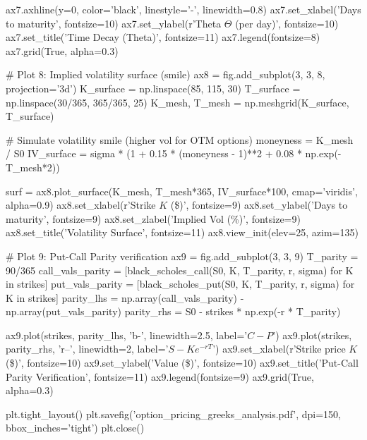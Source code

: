 \documentclass[a4paper, 11pt]{article}
\begin{document}
\begin{pycode}
ax7.axhline(y=0, color='black', linestyle='-', linewidth=0.8)
ax7.set_xlabel('Days to maturity', fontsize=10)
ax7.set_ylabel(r'Theta $\Theta$ (per day)', fontsize=10)
ax7.set_title('Time Decay (Theta)', fontsize=11)
ax7.legend(fontsize=8)
ax7.grid(True, alpha=0.3)

# Plot 8: Implied volatility surface (smile)
ax8 = fig.add_subplot(3, 3, 8, projection='3d')
K_surface = np.linspace(85, 115, 30)
T_surface = np.linspace(30/365, 365/365, 25)
K_mesh, T_mesh = np.meshgrid(K_surface, T_surface)

# Simulate volatility smile (higher vol for OTM options)
moneyness = K_mesh / S0
IV_surface = sigma * (1 + 0.15 * (moneyness - 1)**2 + 0.08 * np.exp(-T_mesh*2))

surf = ax8.plot_surface(K_mesh, T_mesh*365, IV_surface*100, cmap='viridis', alpha=0.9)
ax8.set_xlabel(r'Strike $K$ (\$)', fontsize=9)
ax8.set_ylabel('Days to maturity', fontsize=9)
ax8.set_zlabel('Implied Vol (\%)', fontsize=9)
ax8.set_title('Volatility Surface', fontsize=11)
ax8.view_init(elev=25, azim=135)

# Plot 9: Put-Call Parity verification
ax9 = fig.add_subplot(3, 3, 9)
T_parity = 90/365
call_vals_parity = [black_scholes_call(S0, K, T_parity, r, sigma) for K in strikes]
put_vals_parity = [black_scholes_put(S0, K, T_parity, r, sigma) for K in strikes]
parity_lhs = np.array(call_vals_parity) - np.array(put_vals_parity)
parity_rhs = S0 - strikes * np.exp(-r * T_parity)

ax9.plot(strikes, parity_lhs, 'b-', linewidth=2.5, label='$C - P$')
ax9.plot(strikes, parity_rhs, 'r--', linewidth=2, label='$S - Ke^{-rT}$')
ax9.set_xlabel(r'Strike price $K$ (\$)', fontsize=10)
ax9.set_ylabel('Value (\$)', fontsize=10)
ax9.set_title('Put-Call Parity Verification', fontsize=11)
ax9.legend(fontsize=9)
ax9.grid(True, alpha=0.3)

plt.tight_layout()
plt.savefig('option_pricing_greeks_analysis.pdf', dpi=150, bbox_inches='tight')
plt.close()
\end{pycode}
\end{document}
